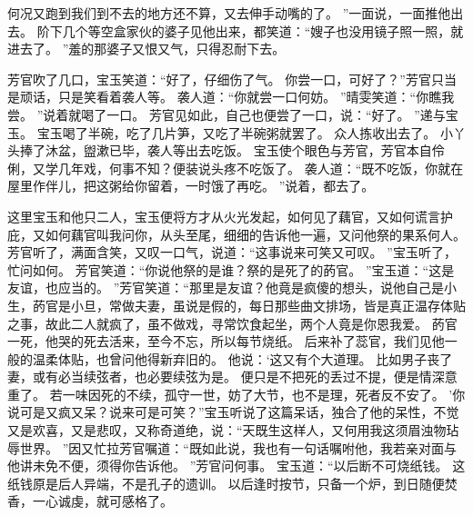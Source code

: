 何况又跑到我们到不去的地方还不算，又去伸手动嘴的了。
”一面说，一面推他出去。
阶下几个等空盒家伙的婆子见他出来，都笑道：“嫂子也没用镜子照一照，就进去了。
”羞的那婆子又恨又气，只得忍耐下去。
\par
芳官吹了几口，宝玉笑道：“好了，仔细伤了气。
你尝一口，可好了？”芳官只当是顽话，只是笑看着袭人等。
袭人道：“你就尝一口何妨。
”晴雯笑道：“你瞧我尝。
”说着就喝了一口。
芳官见如此，自己也便尝了一口，说：“好了。
”递与宝玉。
宝玉喝了半碗，吃了几片笋，又吃了半碗粥就罢了。
众人拣收出去了。
小丫头捧了沐盆，盥漱已毕，袭人等出去吃饭。
宝玉使个眼色与芳官，芳官本自伶俐，又学几年戏，何事不知？便装说头疼不吃饭了。
袭人道：“既不吃饭，你就在屋里作伴儿，把这粥给你留着，一时饿了再吃。
”说着，都去了。
\par
这里宝玉和他只二人，宝玉便将方才从火光发起，如何见了藕官，又如何谎言护庇，又如何藕官叫我问你，从头至尾，细细的告诉他一遍，又问他祭的果系何人。
芳官听了，满面含笑，又叹一口气，说道：“这事说来可笑又可叹。
”宝玉听了，忙问如何。
芳官笑道：“你说他祭的是谁？祭的是死了的菂官。
”宝玉道：“这是友谊，也应当的。
”芳官笑道：“那里是友谊？他竟是疯傻的想头，说他自己是小生，菂官是小旦，常做夫妻，虽说是假的，每日那些曲文排场，皆是真正温存体贴之事，故此二人就疯了，虽不做戏，寻常饮食起坐，两个人竟是你恩我爱。
菂官一死，他哭的死去活来，至今不忘，所以每节烧纸。
后来补了蕊官，我们见他一般的温柔体贴，也曾问他得新弃旧的。
他说：‘这又有个大道理。
比如男子丧了妻，或有必当续弦者，也必要续弦为是。
便只是不把死的丢过不提，便是情深意重了。
若一味因死的不续，孤守一世，妨了大节，也不是理，死者反不安了。
’你说可是又疯又呆？说来可是可笑？”宝玉听说了这篇呆话，独合了他的呆性，不觉又是欢喜，又是悲叹，又称奇道绝，说：“天既生这样人，又何用我这须眉浊物玷辱世界。
”因又忙拉芳官嘱道：“既如此说，我也有一句话嘱咐他，我若亲对面与他讲未免不便，须得你告诉他。
”芳官问何事。
宝玉道：“以后断不可烧纸钱。
这纸钱原是后人异端，不是孔子的遗训。
以后逢时按节，只备一个炉，到日随便焚香，一心诚虔，就可感格了。
